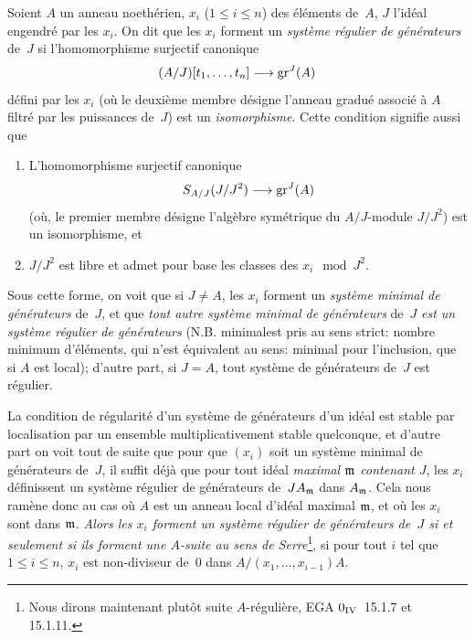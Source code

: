 \begin{remarques}
Soient $A$ un anneau noeth\'erien, $x_i$ ($1 \leq i \leq n$) des
\'el\'ements de~$A$, $J$ l'id\'eal engendr\'e par les
$x_i$. On dit que les $x_i$ forment un \emph{système régulier
de générateurs}
de~$J$ si l'homomorphisme surjectif canonique
$$
(A/J)[t_1,\dots,t_n] \to \gr^J(A)
$$
d\'efini par les $x_i$ (o\`u le deuxi\`eme membre d\'esigne
l'anneau gradu\'e associ\'e \`a $A$ filtr\'e par les
puissances de~$J$) est un \emph{isomorphisme}. Cette condition
signifie aussi que
\begin{enumerate}
\item[(i)] L'homomorphisme surjectif canonique
$$
S_{A/J} (J/J^2) \to \gr^J(A)
$$
(o\`u, le premier membre d\'esigne l'alg\`ebre sym\'etrique du
$A/J$-module $J/J^2$) est un isomorphisme, et
\item[(ii)] $J/J^2$ est libre et admet pour base les classes des $x_i
\mod J^2$.
\end{enumerate}
Sous cette forme, on voit que si $J\neq A$, les $x_i$ forment un
\emph{système minimal de générateurs} de~$J$, et que
\emph{tout autre système minimal de générateurs} de~$J$
\emph{est un système régulier de générateurs}
(N.B. \og minimal\fg est pris au sens strict: nombre minimum
d'\'el\'ements, qui n'est \'equivalent au sens: minimal pour
l'inclusion, que si $A$ est local); d'autre part, si $J=A$, tout
syst\`eme de g\'en\'erateurs de~$J$ est r\'egulier.

La
condition de r\'egularit\'e d'un syst\`eme de
g\'en\'erateurs d'un id\'eal est stable par localisation par un
ensemble multiplicativement stable quelconque, et d'autre part on voit
tout de suite que pour que $(x_i)$ soit un syst\`eme minimal de
g\'en\'erateurs de~$J$, il suffit d\'ej\`a que pour tout id\'eal
\emph{maximal $\mathfrak m$ contenant $J$}, les $x_i$ d\'efinissent un
syst\`eme r\'egulier de g\'en\'erateurs de~$JA_{\mathfrak m}$ dans
$A_{\mathfrak m}$. Cela nous ram\`ene donc au cas o\`u $A$ est un
anneau local d'id\'eal maximal $\mathfrak m$, et o\`u les $x_i$ sont
dans $\mathfrak m$. \emph{Alors les $x_i$ forment un système
régulier de générateurs de~$J$ si et seulement si ils
forment une $A$-suite au sens de Serre}\footnote{Nous dirons
maintenant plut\^ot \og suite $A$-r\'eguli\`ere\fg, \cf EGA
$0_{\textup{IV}}$~15.1.7 et 15.1.11.}, \ie si pour tout $i$ tel que $1
\leq i \leq n$, $x_i$ est non-diviseur de~$0$ dans
$A/(x_1,\dots,x_{i-1})A$.


\end{remarques}

